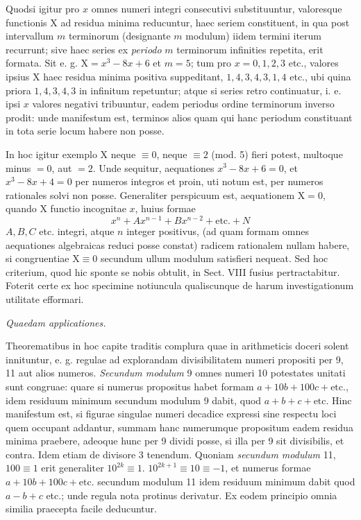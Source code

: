 
Quodsi igitur pro $x$ omnes numeri integri consecutivi substituuntur, valoresque functionis $\mathrm{X}$ ad residua minima reducuntur, haec seriem constituent, in qua post intervallum $m$ terminorum (designante $m$ modulum) iidem termini iterum recurrunt; sive haec series ex \emph{periodo} $m$ terminorum infinities repetita, erit formata. Sit e. g. $\mathrm{X}=x^{3}-8x+6$ et $m=5$; tum pro $x=0, 1, 2, 3$ etc., valores ipsius $\mathrm{X}$ haec residua minima positiva suppeditant, $1, 4, 3, 4, 3, 1, 4$ etc., ubi quina priora $1, 4, 3, 4, 3$ in infinitum repetuntur; atque si series retro continuatur, i. e. ipsi $x$ valores negativi tribuuntur, eadem periodus ordine terminorum inverso prodit: unde manifestum est, terminos alios quam qui hanc periodum constituant in tota serie locum habere non posse.


In hoc igitur exemplo $\mathrm{X}$ neque $\equiv 0$, neque $\equiv 2$ (mod. 5) fieri potest, multoque minus $=0$, aut $=2$. Unde sequitur, aequationes $x^{3}-8x+6=0$, et $x^{3}-8x+4=0$ per numeros integros et proin, uti notum est, per numeros rationales solvi non posse. Generaliter perspicuum est, aequationem $\mathrm{X}=0$, quando $\mathrm{X}$ functio incognitae $x$, huius formae
\[
x^{n}+Ax^{n-1}+Bx^{n-2}+\text{etc.}+N
\]
$A, B, C$ etc. integri, atque $n$ integer positivus, (ad quam formam omnes aequationes algebraicas reduci posse constat) radicem rationalem nullam habere, si congruentiae $\mathrm{X}\equiv 0$ secundum ullum modulum satisfieri nequeat. Sed hoc criterium, quod hic sponte se nobis obtulit, in Sect. VIII fusius pertractabitur. Foterit certe ex hoc specimine notiuncula qualiscunque de harum investigationum utilitate efformari.

\begin{center}\emph{Quaedam applicationes.}\end{center}

Theorematibus in hoc capite traditis complura quae in arithmeticis doceri solent innituntur, e. g. regulae ad explorandam divisibilitatem numeri propositi per 9, 11 aut alios numeros. \emph{Secundum modulum} 9 omnes numeri 10 potestates unitati sunt congruae: quare si numerus propositus habet formam $a+10b+100c+\text{etc.}$, idem residuum minimum secundum modulum 9 dabit, quod $a+b+c+\text{etc.}$ Hinc manifestum est, si figurae singulae numeri decadice expressi sine respectu loci quem occupant addantur, summam hanc numerumque propositum eadem residua minima praebere, adeoque hunc per 9 dividi posse, si illa per 9 sit divisibilis, et contra. Idem etiam de divisore 3 tenendum. Quoniam \emph{secundum modulum} 11, $100\equiv 1$ erit generaliter $10^{2k}\equiv 1$. $10^{2k+1}\equiv 10\equiv -1$, et numerus formae $a+10b+100c+\text{etc.}$ secundum modulum 11 idem residuum minimum dabit quod $a-b+c$ etc.; unde regula nota protinus derivatur. Ex eodem principio omnia similia praecepta facile deducuntur.

